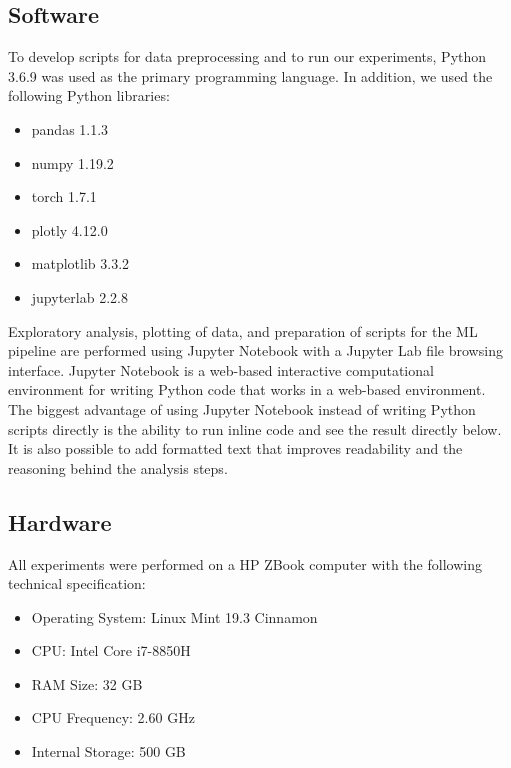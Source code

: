 \begin{table}[h]
\centering
{}
    \caption{Summary of statistics from the Nightly dataset used for training and the Testing dataset used for model evaluation and hyperparameter tuning.}
    \label{tab:training}
\end{table}

\subsection{Software}
To develop scripts for data preprocessing and to run our experiments, Python 3.6.9 was used as the primary programming language. In addition, we used the following Python libraries: 

\begin{itemize}
    \item pandas 1.1.3
    \item numpy 1.19.2
    \item torch 1.7.1
    \item plotly 4.12.0
    \item matplotlib 3.3.2
    \item jupyterlab 2.2.8
\end{itemize}

Exploratory analysis, plotting of data, and preparation of scripts for the ML pipeline are performed using Jupyter Notebook with a Jupyter Lab file browsing interface. Jupyter Notebook is a web-based interactive computational environment for writing Python code that works in a web-based environment. The biggest advantage of using Jupyter Notebook instead of writing Python scripts directly is the ability to run inline code and see the result directly below. It is also possible to add formatted text that improves readability and the reasoning behind the analysis steps.

\subsection{Hardware}
All experiments were performed on a HP ZBook computer with the following technical specification:
\begin{itemize}
    \item Operating System: Linux Mint 19.3 Cinnamon
    \item CPU: Intel Core i7-8850H
    \item RAM Size: 32 GB
    \item CPU Frequency: 2.60 GHz
    \item Internal Storage: 500 GB
\end{itemize}

